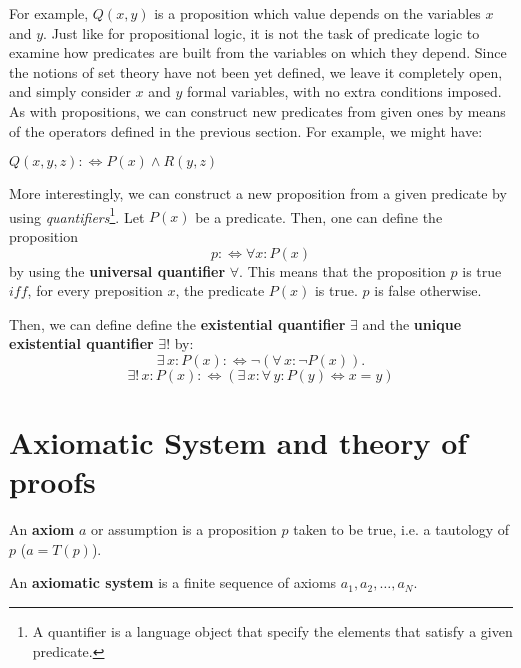 \documentclass[root.tex]{subfiles}
\begin{document}
For example, $Q(x,y)$ is a proposition which value depends on the variables $x$ and $y$. Just like for propositional logic, it is not the task of predicate logic to examine how predicates are built from the variables on which they depend. Since the notions of set theory have not been yet defined, we leave it completely open, and simply consider $x$ and $y$ formal variables, with no extra conditions imposed. As with propositions, we can construct new predicates from given ones by means of the operators defined in the previous section. For example, we might have:
\begin{myex}
  $Q(x,y,z):\Leftrightarrow P(x) \land R(y,z)$
\end{myex}

More interestingly, we can construct a new proposition from a given predicate by using \emph{quantifiers}\footnote{A quantifier is a language object that specify the elements that satisfy a given predicate.}.
Let $P(x)$ be a predicate. Then, one can define the proposition
$$p:\Leftrightarrow \forall x : P(x)$$
by using the \textbf{universal quantifier} $\forall$. This means that the proposition $p$ is true $iff$, for every preposition $x$, the predicate $P(x)$ is true. $p$ is false otherwise.

Then, we can define define the \textbf{existential quantifier} $\exists$  and the \textbf{unique existential quantifier} $\exists !$ by: 
$$
\exists \, x : P(x) : \Leftrightarrow \neg (\forall \, x : \neg P(x)).
$$
$$
\exists ! \, x : P(x) :\Leftrightarrow (\exists \, x : \forall \, y : P(y) \Leftrightarrow x=y)
$$

\section{Axiomatic System and theory of proofs}%

\begin{mydef}
  An \textbf{axiom} $a$ or assumption is a proposition $p$ taken to be true, i.e. a tautology of $p$ ($a=T(p)$).
\end{mydef}

\begin{mydef}
  An \textbf{axiomatic system} is a finite sequence of axioms $a_1,a_2,\ldots,a_N$.
\end{mydef}
\end{document}
